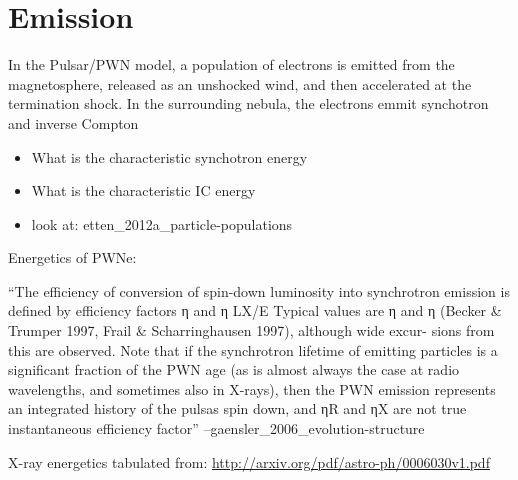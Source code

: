 \section{ Emission}

In the Pulsar/\ac{PWN} model, a population of electrons
is emitted from the magnetosphere, released as an unshocked wind,
and then accelerated at the termination shock. In the surrounding
nebula, the electrons emmit synchotron and inverse Compton

\begin{itemize}
  \item What is the characteristic synchotron energy
  \item What is the characteristic \ac{IC} energy
  \item look at: etten\_2012a\_particle-populations
\end{itemize}




Energetics of PWNe:

``The efficiency of conversion of spin-down luminosity into synchrotron
emission is defined by efficiency factors η and
η LX/E  Typical values are η
and η (Becker \& Trumper 1997, Frail
\& Scharringhausen 1997), although wide excur- sions from this are
observed. Note that if the synchrotron lifetime of emitting particles is
a significant fraction of the PWN age (as is almost always the case at
radio wavelengths, and sometimes also in X-rays), then the PWN emission
represents an integrated history of the pulsas spin down,
and ηR and ηX are not true instantaneous efficiency factor'' --gaensler\_2006\_evolution-structure

X-ray energetics tabulated from: \url{http://arxiv.org/pdf/astro-ph/0006030v1.pdf}




